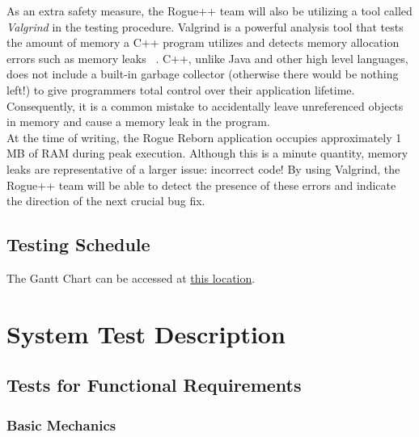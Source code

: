 \documentclass[12pt, titlepage]{article}
\begin{document}
	\bigskip

	As an extra safety measure, the Rogue++ team will also be utilizing a tool called \textit{Valgrind} in the testing procedure.  Valgrind is a powerful analysis tool that tests the amount of memory a C++ program utilizes and detects memory allocation errors such as memory leaks ~\citep{ValgrindHome}.  C++, unlike Java and other high level languages, does not include a built-in garbage collector (otherwise there would be nothing left!) to give programmers total control over their application lifetime.  Consequently, it is a common mistake to accidentally leave unreferenced objects in memory and cause a memory leak in the program.\\

	At the time of writing, the Rogue Reborn application occupies approximately 1 MB of RAM during peak execution.  Although this is a minute quantity, memory leaks are representative of a larger issue: incorrect code!  By using Valgrind, the Rogue++ team will be able to detect the presence of these errors and indicate the direction of the next crucial bug fix.

	\subsection{Testing Schedule}
		
	The Gantt Chart can be accessed at \href{run:../../ProjectSchedule/Rogue.gan}{this location}.

\newpage
\section{System Test Description}
\label{section3}
	
	\subsection{Tests for Functional Requirements}



		\subsubsection{Basic Mechanics}
\end{document}
